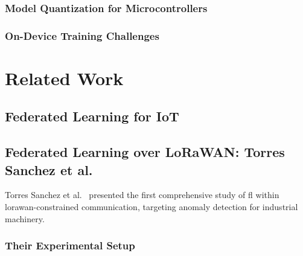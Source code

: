 \documentclass[12pt, a4paper, twoside, openright]{report}
\begin{document}
\subsection{Model Quantization for Microcontrollers}

\subsection{On-Device Training Challenges}


\chapter{Related Work}
\label{ch:related-work}

\section{Federated Learning for IoT}
\label{sec:fl-iot}

\section{Federated Learning over LoRaWAN: Torres Sanchez et al.}
\label{sec:torres-sanchez}

Torres Sanchez et al.~\cite{torressanchez2024federated} presented the first comprehensive study of \gls{fl} within \gls{lorawan}-constrained communication, targeting anomaly detection for industrial machinery.

\subsection{Their Experimental Setup}
\end{document}
